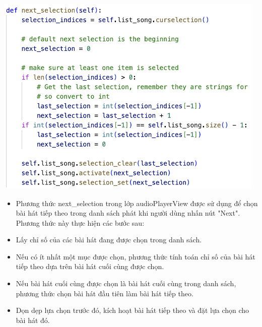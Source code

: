 \documentclass[a4paper]{article}
\begin{document}
\begin{center}
\includegraphics[width=130mm]{template_SGU 2/audio_Next.png}
\end{center}
\begin{itemize}
    \item Phương thức next\_selection trong lớp audioPlayerView được sử dụng để chọn bài hát tiếp theo trong danh sách phát khi người dùng nhấn nút "Next". Phương thức này thực hiện các bước sau:
    \item Lấy chỉ số của các bài hát đang được chọn trong danh sách.
    \item Nếu có ít nhất một mục được chọn, phương thức tính toán chỉ số của bài hát tiếp theo dựa trên bài hát cuối cùng được chọn.
    \item Nếu bài hát cuối cùng được chọn là bài hát cuối cùng trong danh sách, phương thức chọn bài hát đầu tiên làm bài hát tiếp theo.
    \item Dọn dẹp lựa chọn trước đó, kích hoạt bài hát tiếp theo và đặt lựa chọn cho bài hát đó.
\end{itemize}
\end{document}
